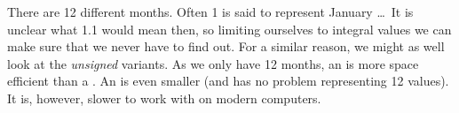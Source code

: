 There are 12 different months. Often 1 is said to represent January \ldots\ It is unclear what 1.1 would mean then, so limiting ourselves to integral values we can make sure that we never have to find out. For a similar reason, we might as well look at the \textsl{unsigned} variants. As we only have 12 months, an  is more space efficient than a . An  is even smaller (and has no problem representing 12 values). It is, however, slower to work with on modern computers.
